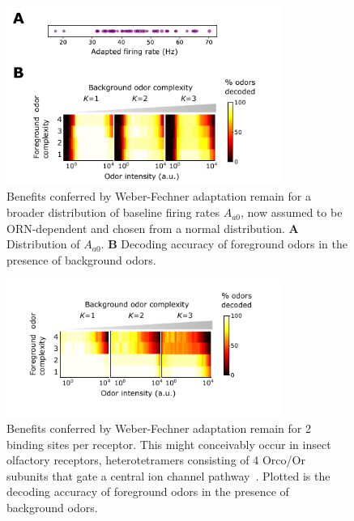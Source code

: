 \documentclass[9pt,twoside,lineno]{pnas-new}
\begin{document}
\begin{figure}
\centering
\includegraphics[width=0.8\textwidth]{figures/broad_A0}
\caption{Benefits conferred by Weber-Fechner adaptation remain for a broader distribution of baseline firing rates $A_{a0}$, now assumed to be ORN-dependent and chosen from a normal distribution.
\textbf{A} Distribution of $A_{a0}$.
\textbf{B} Decoding accuracy of foreground odors in the presence of background odors.}
\label{fig:SI_broad_A0}
\end{figure}


\begin{figure}
\centering
\includegraphics[width=0.8\textwidth]{figures/2_binding_sites}
\caption{Benefits conferred by Weber-Fechner adaptation remain for 2 binding sites per receptor. This might conceivably occur in insect olfactory receptors, heterotetramers consisting of 4 Orco/Or subunits that gate a central ion channel pathway~\cite{orco_structure}. Plotted is the decoding accuracy of foreground odors in the presence of background odors.
}
\label{fig:SI_mult_binding}
\end{figure}
\end{document}
